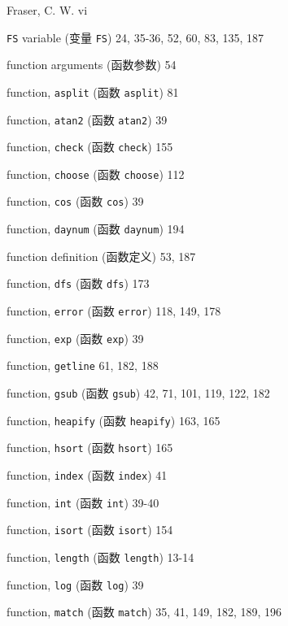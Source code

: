 \begin{multicols}{2}
\hangindent=2pc  Fraser, C. W. vi

\hangindent=2pc  \verb'FS' variable (变量 \verb'FS')
24, 35-36, 52, 60, 83, 135, 187

\hangindent=2pc  function arguments (函数参数) 54

\hangindent=2pc  function, \verb'asplit' (函数 \verb'asplit') 81

\hangindent=2pc  function, \verb'atan2' (函数 \verb'atan2') 39

\hangindent=2pc  function, \verb'check' (函数 \verb'check') 155

\hangindent=2pc  function, \verb'choose' (函数 \verb'choose') 112

\hangindent=2pc  function, \verb'cos' (函数 \verb'cos') 39

\hangindent=2pc  function, \verb'daynum' (函数 \verb'daynum') 194

\hangindent=2pc  function definition (函数定义) 53, 187

\hangindent=2pc  function, \verb'dfs' (函数 \verb'dfs') 173

\hangindent=2pc  function, \verb'error' (函数 \verb'error')
118, 149, 178

\hangindent=2pc  function, \verb'exp' (函数 \verb'exp') 39

\hangindent=2pc  function, \verb'getline' 61, 182, 188

\hangindent=2pc  function, \verb'gsub' (函数 \verb'gsub')
42, 71, 101, 119, 122, 182

\hangindent=2pc  function, \verb'heapify' (函数 \verb'heapify')
163, 165

\hangindent=2pc  function, \verb'hsort' (函数 \verb'hsort') 165

\hangindent=2pc  function, \verb'index' (函数 \verb'index') 41

\hangindent=2pc  function, \verb'int' (函数 \verb'int') 39-40

\hangindent=2pc  function, \verb'isort' (函数 \verb'isort') 154

\hangindent=2pc  function, \verb'length' (函数 \verb'length') 13-14

\hangindent=2pc  function, \verb'log' (函数 \verb'log') 39

\hangindent=2pc  function, \verb'match' (函数 \verb'match')
35, 41, 149, 182, 189, 196


\end{multicols}
